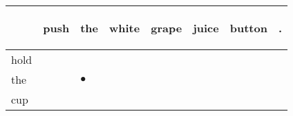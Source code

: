 \documentclass[landscape]{article}
\newcommand{\ssp}{\hspace{2pt}}
\newcommand{\mex}{\cellcolor{g}$\bullet$}
\begin{document}
\noindent\begin{tabular}{|l|p{10pt}|p{10pt}|p{10pt}|p{10pt}|p{10pt}|p{10pt}|p{10pt}|}
\hline
&\begin{sideways}\cellcolor{ref0}push\hspace{12pt}\end{sideways}&\begin{sideways}\cellcolor{ref1}the\hspace{12pt}\end{sideways}&\begin{sideways}\cellcolor{ref2}white\hspace{12pt}\end{sideways}&\begin{sideways}\cellcolor{ref3}grape\hspace{12pt}\end{sideways}&\begin{sideways}\cellcolor{ref4}juice\hspace{12pt}\end{sideways}&\begin{sideways}\cellcolor{ref5}button\hspace{12pt}\end{sideways}&\begin{sideways}\cellcolor{ref6}.\hspace{12pt}\end{sideways}\\
\hline
\ssp hold \ssp&\hspace{2pt}&\hspace{2pt}&\hspace{2pt}&\hspace{2pt}&\hspace{2pt}&\hspace{2pt}&\hspace{2pt}\\
\hline
\ssp \cellcolor{ref1}the \ssp&\hspace{2pt}&\hspace{2pt}\mex&\hspace{2pt}&\hspace{2pt}&\hspace{2pt}&\hspace{2pt}&\hspace{2pt}\\
\hline
\ssp cup \ssp&\hspace{2pt}&\hspace{2pt}&\hspace{2pt}&\hspace{2pt}&\hspace{2pt}&\hspace{2pt}&\hspace{2pt}\\

\end{tabular}
\end{document}
